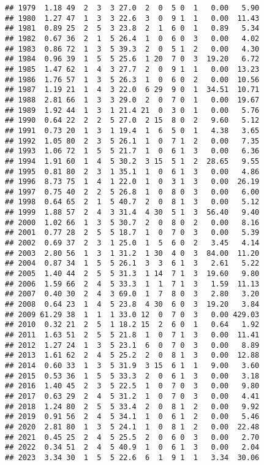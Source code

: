 \documentclass[
]{article}
\begin{document}
\begin{verbatim}
## 1979  1.18 49  2  3  3 27.0  2  0  5 0  1   0.00   5.90
## 1980  1.27 47  1  3  3 22.6  3  0  9 1  1   0.00  11.43
## 1981  0.89 25  2  5  3 23.8  2  1  6 0  1   0.89   5.34
## 1982  0.67 36  2  1  5 26.4  1  0  6 0  3   0.00   4.02
## 1983  0.86 72  1  3  5 39.3  2  0  5 1  2   0.00   4.30
## 1984  0.96 39  1  5  5 25.6  1 20  7 0  3  19.20   6.72
## 1985  1.47 62  1  4  3 27.7  2  0  9 1  1   0.00  13.23
## 1986  1.76 57  1  3  5 26.3  1  0  6 0  2   0.00  10.56
## 1987  1.19 21  1  4  3 22.0  6 29  9 0  1  34.51  10.71
## 1988  2.81 66  1  3  3 29.0  2  0  7 0  1   0.00  19.67
## 1989  1.92 44  1  3  1 21.4 21  0  3 0  1   0.00   5.76
## 1990  0.64 22  2  2  5 27.0  2 15  8 0  2   9.60   5.12
## 1991  0.73 20  1  3  1 19.4  1  6  5 0  1   4.38   3.65
## 1992  1.05 80  2  3  5 26.1  1  0  7 1  2   0.00   7.35
## 1993  1.06 72  1  5  5 21.7  1  0  6 1  3   0.00   6.36
## 1994  1.91 60  1  4  5 30.2  3 15  5 1  2  28.65   9.55
## 1995  0.81 80  2  3  1 35.1  1  0  6 1  3   0.00   4.86
## 1996  8.73 75  1  4  1 22.0  1  0  3 1  3   0.00  26.19
## 1997  0.75 40  2  2  5 26.8  1  0  8 0  3   0.00   6.00
## 1998  0.64 65  2  1  5 40.7  2  0  8 1  3   0.00   5.12
## 1999  1.88 57  2  4  3 31.4  4 30  5 1  3  56.40   9.40
## 2000  1.02 66  1  3  5 30.7  2  0  8 0  2   0.00   8.16
## 2001  0.77 28  2  5  5 18.7  1  0  7 0  3   0.00   5.39
## 2002  0.69 37  2  3  1 25.0  1  5  6 0  2   3.45   4.14
## 2003  2.80 56  1  3  1 31.2  1 30  4 0  3  84.00  11.20
## 2004  0.87 34  1  5  5 26.1  3  3  6 1  3   2.61   5.22
## 2005  1.40 44  2  5  5 31.3  1 14  7 1  3  19.60   9.80
## 2006  1.59 66  2  4  5 33.3  1  1  7 1  3   1.59  11.13
## 2007  0.40 30  2  4  3 69.0  1  7  8 0  3   2.80   3.20
## 2008  0.64 23  1  4  5 23.8  4 30  6 0  3  19.20   3.84
## 2009 61.29 38  1  1  1 33.0 12  0  7 0  3   0.00 429.03
## 2010  0.32 21  2  5  1 18.2 15  2  6 0  1   0.64   1.92
## 2011  1.63 51  2  5  5 21.8  1  0  7 1  3   0.00  11.41
## 2012  1.27 24  1  3  5 23.1  6  0  7 0  3   0.00   8.89
## 2013  1.61 62  2  4  5 25.2  2  0  8 1  3   0.00  12.88
## 2014  0.60 33  1  3  5 31.9  3 15  6 1  1   9.00   3.60
## 2015  0.53 36  1  5  5 33.3  2  0  6 1  3   0.00   3.18
## 2016  1.40 45  2  3  5 22.5  1  0  7 0  3   0.00   9.80
## 2017  0.63 29  2  4  5 31.2  1  0  7 0  3   0.00   4.41
## 2018  1.24 80  2  5  5 33.4  2  0  8 1  2   0.00   9.92
## 2019  0.91 56  2  4  5 34.1  1  0  6 1  2   0.00   5.46
## 2020  2.81 80  1  3  5 24.1  1  0  8 1  2   0.00  22.48
## 2021  0.45 25  2  4  5 25.5  2  0  6 0  3   0.00   2.70
## 2022  0.34 51  2  4  5 40.9  1  0  6 1  3   0.00   2.04
## 2023  3.34 30  1  5  5 22.6  6  1  9 1  1   3.34  30.06

\end{verbatim}
\end{document}
